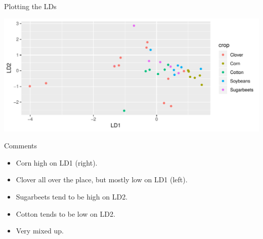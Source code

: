 \begin{frame}[fragile]{Plotting the LDs}
  
\begin{knitrout}
\color{fgcolor}\begin{kframe}
\begin{alltt}
\hlstd{(}\hlopt{+}
  \hlstd{()}\hlopt{+}\hlstd{()}\hlopt{+}
  \hlstd{(}
\end{alltt}
\end{kframe}
\includegraphics[width=\maxwidth]{figure/piacentini-1} 

\end{knitrout}
  
\end{frame}

\begin{frame}[figure]{Comments}
  
  \begin{itemize}
  \item Corn high on LD1 (right).
  \item Clover all over the place, but mostly low on LD1 (left).
  \item Sugarbeets tend to be high on LD2.
  \item Cotton tends to be low on LD2.
  \item Very mixed up.
  \end{itemize}
  
\end{frame}

